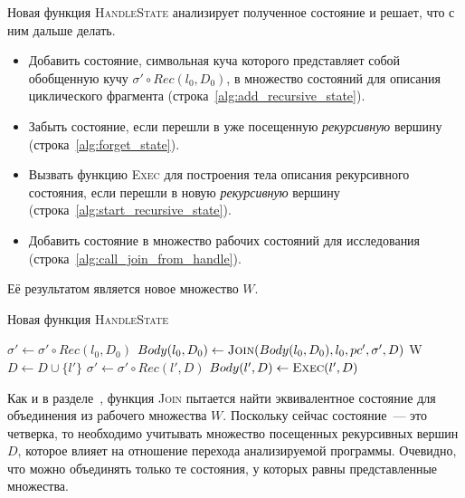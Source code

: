 Новая функция \textsc{HandleState} анализирует полученное состояние и решает, что с ним дальше делать.
\begin{itemize}
    \item Добавить состояние, символьная куча которого представляет собой обобщенную кучу $\sigma' \circ Rec(l_0,D_0)$, в множество состояний для описания циклического фрагмента (строка~\ref{alg:add_recursive_state}).
    \item Забыть состояние, если перешли в уже посещенную \emph{рекурсивную} вершину (строка~\ref{alg:forget_state}).
    \item Вызвать функцию \textsc{Exec} для построения тела описания рекурсивного состояния, если перешли в новую \emph{рекурсивную} вершину (строка~\ref{alg:start_recursive_state}).
    \item Добавить состояние в множество рабочих состояний для исследования (строка~\ref{alg:call_join_from_handle}).
\end{itemize}
Её результатом является новое множество $W$.

\begin{algorithm}
    \caption{Новая функция \textsc{HandleState}} \label{new_handle_state}
\begin{algorithmic}[1]
         \label{alg:deal_with_new_state_start}
            \State $\sigma' \gets \sigma' \circ Rec(l_0,D_0)$
            \State $Body(l_0,D_0) \gets \text{\textsc{Join}($Body(l_0,D_0), l_0, pc',\sigma',D$)}$
            \State \Return W \label{alg:add_recursive_state}
         \label{alg:forget_state}
            \State \Return
            \State $D \gets D \cup \{l'\}$
            \State $\sigma' \gets \sigma' \circ Rec(l',D)$ \label{alg:enter_recursive_symbol}
                \State $Body(l',D) \gets \text{\textsc{Exec}}(l',D)$ \label{alg:start_recursive_state}
            \EndIf
        \EndIf

        \State \Return {} \label{alg:call_join_from_handle}\;
    \EndProcedure
\end{algorithmic}
\end{algorithm}

Как и в разделе~, функция \textsc{Join} пытается найти эквивалентное состояние для объединения из рабочего множества $W$. Поскольку сейчас состояние~--- это четверка, то необходимо учитывать множество посещенных рекурсивных вершин $D$, которое влияет на отношение перехода анализируемой программы.
Очевидно, что можно объединять только те состояния, у которых равны представленные множества.

